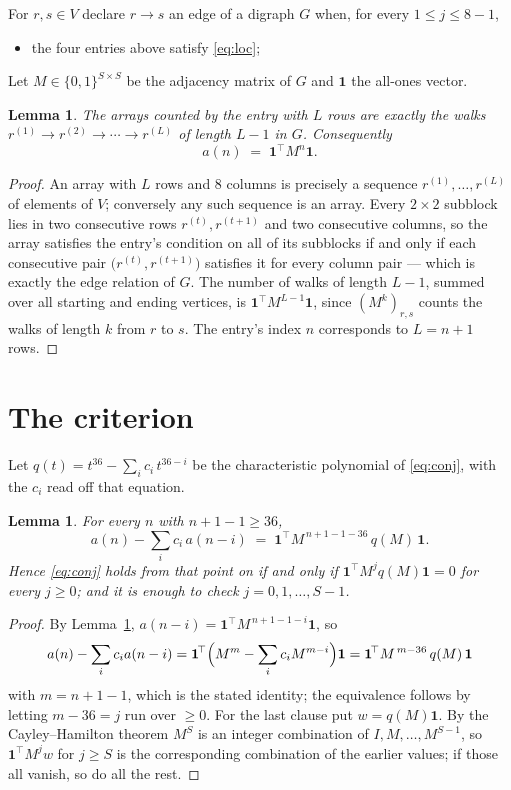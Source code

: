 \documentclass[11pt,a4paper]{article}
\theoremstyle{plain}
\newtheorem{lemma}[theorem]{Lemma}
\theoremstyle{definition}
\begin{document}
For $r,s\in V$ declare $r\to s$ an edge of a digraph $G$ when, for every
$1\le j\le 8-1$,
\begin{itemize}
\item the four entries above satisfy \eqref{eq:loc};

\end{itemize}
Let $M\in\{0,1\}^{S\times S}$ be the adjacency matrix of $G$ and $\mathbf{1}$ the
all-ones vector.

\begin{lemma}\label{lem:walk}
The arrays counted by the entry with $L$ rows are exactly the walks
$r^{(1)}\to r^{(2)}\to\cdots\to r^{(L)}$ of length $L-1$ in $G$. Consequently
\[
a(n)\;=\;\mathbf{1}^{\!\top}M^{n}\mathbf{1} .
\]
\end{lemma}

\begin{proof}
An array with $L$ rows and $8$ columns is precisely a sequence
$r^{(1)},\dots,r^{(L)}$ of elements of $V$; conversely any such sequence is an array.
Every $2\times2$ subblock lies in two consecutive rows $r^{(t)},r^{(t+1)}$ and two
consecutive columns, so the array satisfies the entry's condition on all of its subblocks
if and only if each consecutive pair $\bigl(r^{(t)},r^{(t+1)}\bigr)$ satisfies it for
every column pair --- which is exactly the edge relation of $G$. The number of walks of
length $L-1$, summed over all starting and ending vertices, is
$\mathbf{1}^{\!\top}M^{L-1}\mathbf{1}$, since $(M^{k})_{r,s}$ counts the walks of
length $k$ from $r$ to $s$. The entry's index $n$ corresponds to $L=n+1$ rows.
\end{proof}

\section{The criterion}

Let $q(t)=t^{36}-\sum_i c_i\,t^{36-i}$ be the characteristic polynomial of
\eqref{eq:conj}, with the $c_i$ read off that equation.

\begin{lemma}\label{lem:crit}
For every $n$ with $n+1-1\ge36$,
\[
a(n)-\sum_i c_i\,a(n-i)\;=\;\mathbf{1}^{\!\top}M^{\,n+1-1-36}\,q(M)\,\mathbf{1} .
\]
Hence \eqref{eq:conj} holds from that point on if and only if
$\mathbf{1}^{\!\top}M^{j}q(M)\mathbf{1}=0$ for every $j\ge0$; and it is enough to check
$j=0,1,\dots,S-1$.
\end{lemma}

\begin{proof}
By Lemma~\ref{lem:walk}, $a(n-i)=\mathbf{1}^{\!\top}M^{\,n+1-1-i}\mathbf{1}$, so
\[
a(n)-\sum_i c_i a(n-i)
=\mathbf{1}^{\!\top}\Bigl(M^{m}-\sum_i c_i M^{m-i}\Bigr)\mathbf{1}
=\mathbf{1}^{\!\top}M^{\,m-36}\,q(M)\,\mathbf{1}
\]
with $m=n+1-1$, which is the stated identity; the equivalence follows by letting
$m-36=j$ run over $\ge0$. For the last clause put $w=q(M)\mathbf{1}$. By the
Cayley--Hamilton theorem $M^{S}$ is an integer combination of $I,M,\dots,M^{S-1}$, so
$\mathbf{1}^{\!\top}M^{j}w$ for $j\ge S$ is the corresponding combination of the earlier
values; if those all vanish, so do all the rest.
\end{proof}
\end{document}
